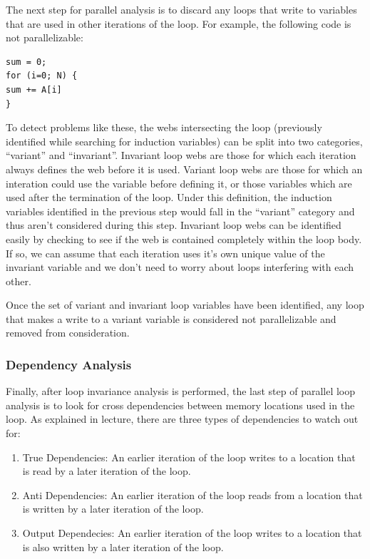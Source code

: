 \documentclass[11pt]{article}
\begin{document}
The next step for parallel analysis is to discard any loops that write
to variables that are used in other iterations of the loop. For
example, the following code is not parallelizable: 

\begin{verbatim}
sum = 0;
for (i=0; N) { 
sum += A[i] 
}
\end{verbatim}

To detect problems like these, the webs intersecting the loop
(previously identified while searching for induction variables) can be
split into two categories, ``variant'' and ``invariant''. Invariant
loop webs are those for which each iteration always defines the web
before it is used. Variant loop webs are those for which an interation
could use the variable before defining it, or those variables which are used
after the termination of the loop. Under this definition, the
induction variables identified in the previous step would fall in the
``variant'' category and thus aren't considered during this
step. Invariant loop webs can be identified easily by checking to see
if the web is contained completely within the loop body. If so, we can
assume that each iteration uses it's own unique value of the invariant
variable and we don't need to worry about loops interfering with each
other. 

Once the set of variant and invariant loop variables have been
identified, any loop that makes a write to a variant variable is
considered not parallelizable and removed from consideration. 

\subsubsection {Dependency Analysis}

Finally, after loop invariance analysis is performed, the last step of
parallel loop analysis is to look for cross dependencies between
memory locations used in the loop. As explained in lecture, there are three
types of dependencies to watch out for: 

\begin{enumerate} 

\item True Dependencies: An earlier iteration of the loop writes
  to a location that is read by a later iteration of the loop. 

\item Anti Dependencies: An earlier iteration of the loop reads from a
  location  that is written by a later iteration of the loop. 

\item Output Dependecies: An earlier iteration of the loop writes to a
  location that is also written by a later iteration of the loop. 

\end{enumerate} 
\end{document}

